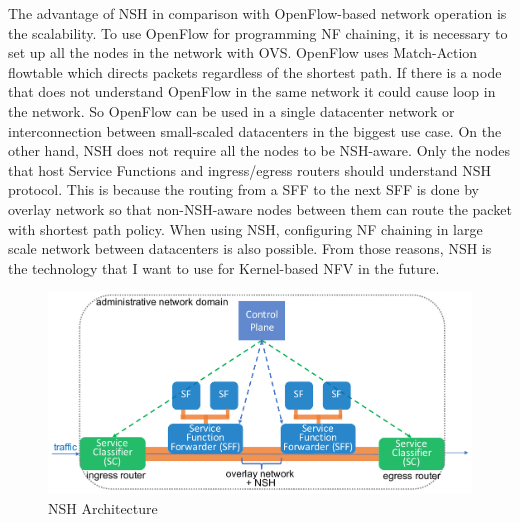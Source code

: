 \begin{itemize}
			The advantage of NSH in comparison with OpenFlow-based network operation is the scalability. To use OpenFlow for programming NF chaining, it is necessary to set up all the nodes in the network with OVS. OpenFlow uses Match-Action flowtable which directs packets regardless of the shortest path. If there is a node that does not understand OpenFlow in the same network it could cause loop in the network. So OpenFlow can be used in a single datacenter network or interconnection between small-scaled datacenters in the biggest use case. On the other hand, NSH does not require all the nodes to be NSH-aware. Only the nodes that host Service Functions and ingress/egress routers should understand NSH protocol. This is because the routing from a SFF to the next SFF is done by overlay network so that non-NSH-aware nodes between them can route the packet with shortest path policy. When using NSH, configuring NF chaining in large scale network between datacenters is also possible. From those reasons, NSH is the technology that I want to use for Kernel-based NFV in the future. 
	\end{itemize}
	
\begin{figure}[t]
	\centering
	\includegraphics[width=120mm]{pics/NSH.pdf}
	\caption{NSH Architecture}
	\label{fig: NSH}
\end{figure}

